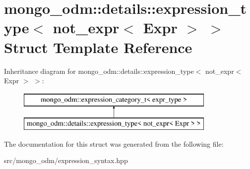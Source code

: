 \hypertarget{structmongo__odm_1_1details_1_1expression__type_3_01not__expr_3_01Expr_01_4_01_4}{}\section{mongo\+\_\+odm\+:\+:details\+:\+:expression\+\_\+type$<$ not\+\_\+expr$<$ Expr $>$ $>$ Struct Template Reference}
\label{structmongo__odm_1_1details_1_1expression__type_3_01not__expr_3_01Expr_01_4_01_4}
Inheritance diagram for mongo\+\_\+odm\+:\+:details\+:\+:expression\+\_\+type$<$ not\+\_\+expr$<$ Expr $>$ $>$\+:\begin{figure}[H]
\begin{center}
\leavevmode
\includegraphics[height=2.000000cm]{structmongo__odm_1_1details_1_1expression__type_3_01not__expr_3_01Expr_01_4_01_4}
\end{center}
\end{figure}


The documentation for this struct was generated from the following file\+:\begin{DoxyCompactItemize}
\item 
src/mongo\+\_\+odm/expression\+\_\+syntax.\+hpp\end{DoxyCompactItemize}
